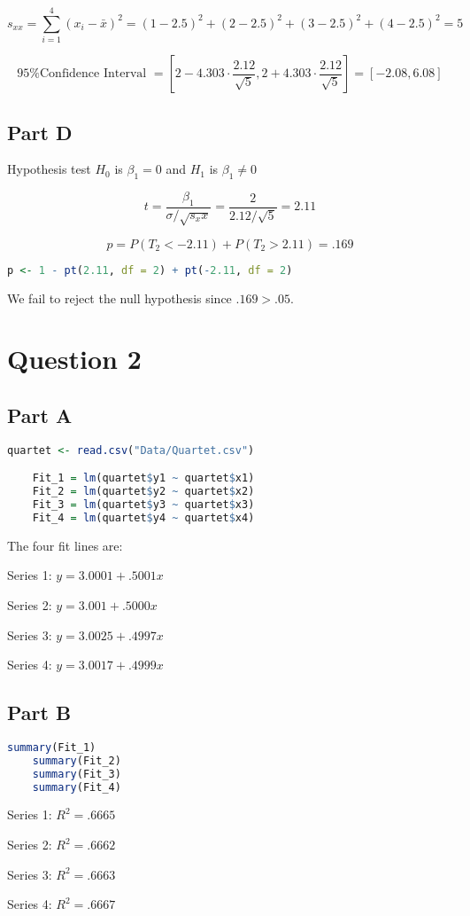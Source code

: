 \documentclass[letterpaper]{article}
\begin{document}
$$s_{xx} = \sum_{i=1}^4 (x_i - \bar{x})^2 = (1 - 2.5)^2 + (2 - 2.5)^2 + (3 - 2.5)^2 + (4 - 2.5)^2 = 5$$

$$\text{95\% Confidence Interval } = [2 - 4.303 \cdot \frac{2.12}{\sqrt{5}}, 2 + 4.303 \cdot \frac{2.12}{\sqrt{5}}] = [-2.08, 6.08]$$

\subsection*{Part D}

Hypothesis test $H_0$ is $\beta_1 = 0$ and $H_1$ is $\beta_1 \neq 0$

$$t = \frac{\beta_1}{\sigma / \sqrt{s_xx}} = \frac{2}{2.12 / \sqrt{5}} = 2.11$$

$$p = P(T_2 < -2.11) + P(T_2 > 2.11) = .169$$

\begin{lstlisting}[language=R]
    p <- 1 - pt(2.11, df = 2) + pt(-2.11, df = 2)
\end{lstlisting}

\noindent We fail to reject the null hypothesis since $.169 > .05$.

\newpage

\section*{Question 2}

\subsection*{Part A}

\begin{lstlisting}[language=R]
    quartet <- read.csv("Data/Quartet.csv")

    Fit_1 = lm(quartet$y1 ~ quartet$x1)
    Fit_2 = lm(quartet$y2 ~ quartet$x2)
    Fit_3 = lm(quartet$y3 ~ quartet$x3)
    Fit_4 = lm(quartet$y4 ~ quartet$x4)
\end{lstlisting}

\noindent The four fit lines are:

\noindent Series 1: $y = 3.0001 + .5001x$

\noindent Series 2: $y = 3.001 + .5000x$

\noindent Series 3: $y = 3.0025 + .4997x$

\noindent Series 4: $y = 3.0017 + .4999x$

\subsection*{Part B}

\begin{lstlisting}[language=R]
    summary(Fit_1)
    summary(Fit_2)
    summary(Fit_3)
    summary(Fit_4)
\end{lstlisting}

\noindent Series 1: $R^2 = .6665$

\noindent Series 2: $R^2 = .6662$

\noindent Series 3: $R^2 = .6663$

\noindent Series 4: $R^2 = .6667$
\end{document}
